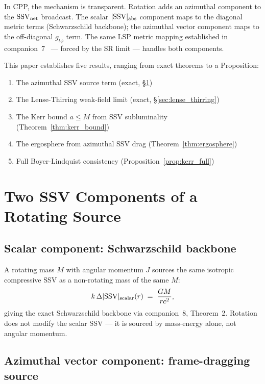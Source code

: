 \documentclass[12pt]{article}
\newcommand{\SSV}{\mathrm{SSV}}
\begin{document}
In CPP, the mechanism is transparent.  Rotation adds an azimuthal
component to the $\SSV_{\rm net}$ broadcast.  The scalar $|\SSV|_{\rm abs}$
component maps to the diagonal metric terms (Schwarzschild backbone);
the azimuthal vector component maps to the off-diagonal $g_{t\phi}$
term.  The same LSP metric mapping established in companion~7~\cite{c7}
— forced by the SR limit — handles both components.

This paper establishes five results, ranging from exact theorems to
a Proposition:
\begin{enumerate}[noitemsep]
  \item The azimuthal SSV source term (exact, §\ref{sec:source})
  \item The Lense-Thirring weak-field limit (exact, §\ref{sec:lense_thirring})
  \item The Kerr bound $a \leq M$ from SSV subluminality
    (Theorem~\ref{thm:kerr_bound})
  \item The ergosphere from azimuthal SSV drag
    (Theorem~\ref{thm:ergosphere})
  \item Full Boyer-Lindquist consistency
    (Proposition~\ref{prop:kerr_full})
\end{enumerate}

\section{Two SSV Components of a Rotating Source}
\label{sec:source}

\subsection{Scalar component: Schwarzschild backbone}

A rotating mass $M$ with angular momentum $J$ sources the same
isotropic compressive SSV as a non-rotating mass of the same $M$:
\begin{equation}
  k\,\Delta|\SSV|_{\rm scalar}(r) \;=\; \frac{GM}{rc^2},
  \label{eq:ssv_scalar}
\end{equation}
giving the exact Schwarzschild backbone via companion~8,
Theorem~2.  Rotation does not modify the scalar SSV — it is sourced
by mass-energy alone, not angular momentum.

\subsection{Azimuthal vector component: frame-dragging source}
\end{document}
